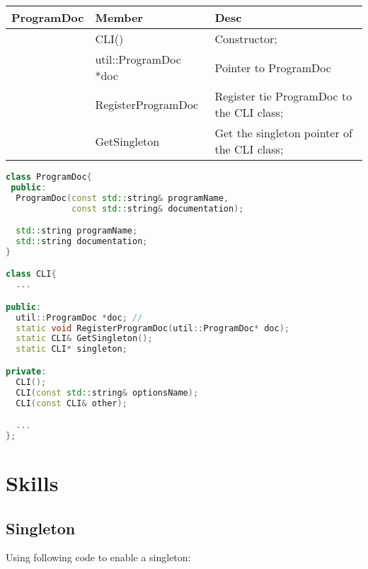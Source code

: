 \documentclass[11pt]{article}
\begin{document}
\begin{center}
  \begin{tabular}{|p{3cm}|p{6cm}|p{6cm}|}
    \hline
     \textbf{ProgramDoc} & \textbf{Member}& \textbf{Desc} \\
    \hline
     & CLI() & Constructor; \\
    \hline
     &  util::ProgramDoc *doc& Pointer to ProgramDoc\\
    \hline
     & RegisterProgramDoc & Register tie ProgramDoc to the CLI class;\\
    \hline
     & GetSingleton & Get the singleton pointer of the CLI class; \\
    \hline
  \end{tabular}
\end{center}


\begin{lstlisting}[language=c++,label=lst:1lst,caption=CLI class]
class ProgramDoc{
 public:
  ProgramDoc(const std::string& programName,
             const std::string& documentation);

  std::string programName;
  std::string documentation;
}

class CLI{
  ...

public:
  util::ProgramDoc *doc; // 
  static void RegisterProgramDoc(util::ProgramDoc* doc);
  static CLI& GetSingleton();
  static CLI* singleton;

private: 
  CLI();
  CLI(const std::string& optionsName);
  CLI(const CLI& other);

  ...
};
\end{lstlisting}





\clearpage
\section{Skills}%
\label{sec:skills}

\indent
\subsection{Singleton}%
\label{sub:singleton}

Using following code to enable a singleton:
\end{document}
